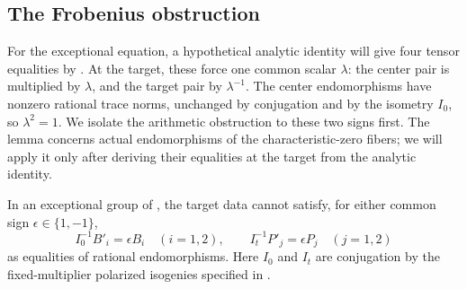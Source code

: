 \subsection{The Frobenius obstruction}

For the exceptional equation, a hypothetical analytic identity will
give four tensor equalities by .  At the target,
these force one common scalar $\lambda$: the center pair is multiplied
by $\lambda$, and the target pair by $\lambda^{-1}$.  The center
endomorphisms have nonzero rational trace norms, unchanged by
conjugation and by the isometry $I_0$, so $\lambda^2=1$.
We isolate the arithmetic obstruction to these two signs first.
The lemma concerns actual endomorphisms of the characteristic-zero
fibers; we will apply it only after deriving their equalities at the
target from the analytic identity.

\begin{lemma}
\label{nid:frobenius}
In an exceptional group of , the target data cannot
satisfy, for either common sign $\epsilon\in\{1,-1\}$,
\begin{equation}
 \label{nid:sign-equalities}
 I_0^{-1}B'_i=\epsilon B_i\quad(i=1,2),
 \qquad
 I_t^{-1}P'_j=\epsilon P_j\quad(j=1,2)
\end{equation}
as equalities of rational endomorphisms.  Here $I_0$ and $I_t$ are
conjugation by the fixed-multiplier polarized isogenies specified in
.
\end{lemma}


